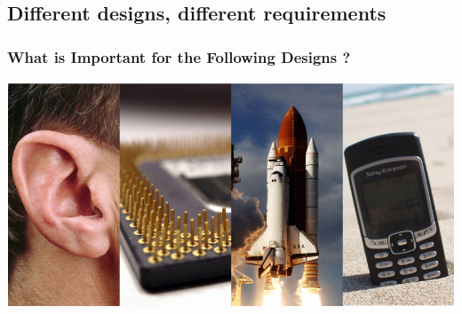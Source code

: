 \documentclass[compress]{beamer}
\begin{document}
\subsection[Examples]{Different designs, different requirements}
\begin{frame}
	\frametitle{What is Important for the Following Designs ?}
		\begin{center}
		\includegraphics[width=\textwidth]{Examples}
	\end{center}
\end{frame}
\end{document}
